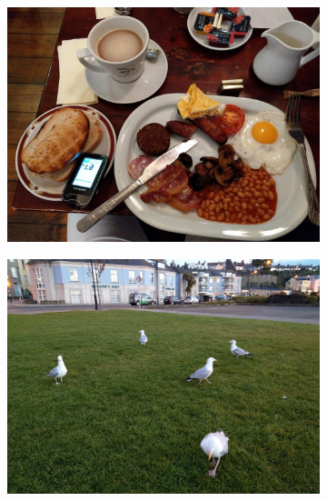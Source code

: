 \begin{figure}[H]
  \centering
  \captionsetup{justification=centering}

  \begin{subfigure}{0.3\textwidth}
  \includegraphics[width=\textwidth]{Sections/4InitialWork/4_images_obj_run1/photo.jpg} 
  \end{subfigure}
  \begin{subfigure}{0.3\textwidth}
  \includegraphics[width=\textwidth]{Sections/4InitialWork/4_images_obj_run3/photo.jpg}
  \end{subfigure}
  \begin{subfigure}{0.3\textwidth}

\end{subfigure}
\end{figure}
